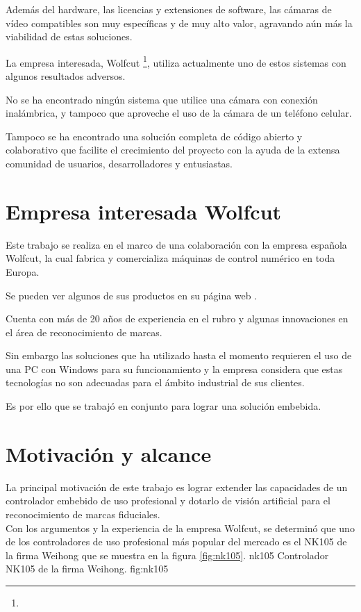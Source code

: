 \clearpage

   Además del hardware, las licencias y extensiones de software, las cámaras de vídeo compatibles son muy específicas y de muy alto valor, agravando aún más la viabilidad de estas soluciones.\par

   La empresa interesada, Wolfcut \footnote{\wolfcutlink}, utiliza actualmente uno de estos sistemas con algunos resultados adversos.\par

   No se ha encontrado ningún sistema que utilice una cámara con conexión inalámbrica, y tampoco que aproveche el uso de la cámara de un teléfono celular.\par

   Tampoco se ha encontrado una solución completa de código abierto y colaborativo que facilite el crecimiento del proyecto con la ayuda de la extensa comunidad de usuarios, desarrolladores y entusiastas.
\section{Empresa interesada Wolfcut}
\label{section:empresa_interesada}

Este trabajo se realiza en el marco de una colaboración con la empresa española Wolfcut, la cual fabrica y comercializa máquinas de control numérico en toda Europa.\par
Se pueden ver algunos de sus productos en su página web \wolfcutlink.\par
Cuenta con más de 20 años de experiencia en el rubro y algunas innovaciones en el área de reconocimiento de marcas.\par
Sin embargo las soluciones que ha utilizado hasta el momento requieren el uso de una PC con Windows para su funcionamiento y la empresa considera que estas tecnologías no son adecuadas para el ámbito industrial de sus clientes.\par
Es por ello que se trabajó en conjunto para lograr una solución embebida.\par

\section{Motivación y alcance}
   La principal motivación de este trabajo es lograr extender las capacidades de un controlador embebido de uso profesional y dotarlo de visión artificial para el reconocimiento de marcas fiduciales. \\
   Con los argumentos y la experiencia de la empresa Wolfcut, se determinó que uno de los controladores de uso profesional más popular del mercado es el NK105 de la firma Weihong \citep{WEBSITE:nk105} que se muestra en la figura \ref{fig:nk105}.
      {nk105}
      {Controlador NK105 de la firma Weihong.}
      {fig:nk105}

